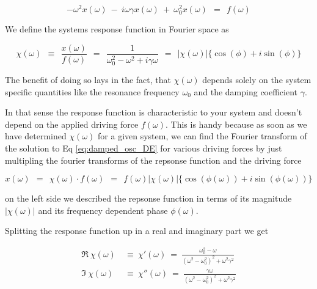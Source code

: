 \documentclass[10pt]{report}
\numberwithin{equation}{chapter}
\newcommand{\refEq}[1]{
  Eq  \ref{#1}
}
\begin{document}
\begin{equation}
  -\omega^2 x(\omega) ~-~ i \omega \gamma x(\omega) ~+~ \omega_0^2 x(\omega) ~~=~~ f(\omega)
\end{equation}


We define the systems response function in Fourier space as

\begin{equation} \label{eq:damped_osc_respond}
  \chi(\omega) ~~\equiv~~ \frac{x(\omega)}{f(\omega)} ~~=~~ \frac{1}{\omega_0^2 - \omega^2 + i\gamma\omega} ~~=~~ | \chi(\omega)| \{\cos(\phi) + i\sin(\phi) \}
\end{equation}

The benefit of doing so lays in the fact, that $\chi(\omega)$ depends solely on the system specific 	quantities like the resonance frequency $\omega_0$ and the damping coefficient $\gamma$.

In that sense the response function is characteristic to your system and doesn't depend on the applied driving force $f(\omega)$. This is handy because as soon as we have determined $\chi(\omega)$ for a given system, we can find the Fourier transform of the solution to \refEq{eq:damped_osc_DE} for various driving forces by just multipling the fourier transforms of the repsonse function and the driving force 

\begin{equation}
  x(\omega) ~~=~~ \chi(\omega) \cdot f(\omega) 
  ~~=~~ f(\omega) |\chi(\omega)| \{\cos(\phi(\omega)) +i \sin(\phi(\omega))\}
\end{equation}

on the left side we described the repsonse function in terms of its magnitude $|\chi(\omega)|$ and its frequency dependent phase $\phi(\omega)$.



Splitting the response function up in a real and imaginary part we get

\begin{align}
  \Re\ \chi(\omega) ~& \equiv~ \chi'(\omega) ~=~ \frac{\omega^2_0 - \omega}{(\omega^2-\omega^2_0)^2 + \omega^2 \gamma^2} \\
  \Im\ \chi(\omega) ~& \equiv~ \chi''(\omega) ~=~ \frac{\gamma \omega}{(\omega^2 - \omega^2_0)^2 + \omega^2 \gamma^2}
\end{align}
\end{document}

